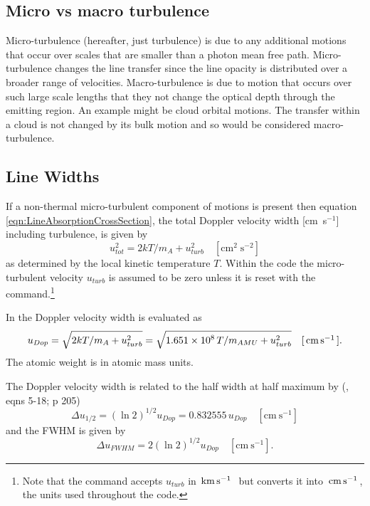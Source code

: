 \subsection{Micro vs macro turbulence}

Micro-turbulence (hereafter, just turbulence) is due to any additional
motions that occur over scales that are smaller than a photon mean free
path.
Micro-turbulence changes the line transfer since the line opacity
is distributed over a broader range of velocities.
Macro-turbulence is
due to motion that occurs over such large scale lengths that they not change
the optical depth through the emitting region.
An example might be cloud
orbital motions.
The transfer within a cloud is not changed by its bulk
motion and so would be considered macro-turbulence.

\subsection{Line Widths}

If a non-thermal micro-turbulent component of motions is present then
equation \ref{eqn:LineAbsorptionCrossSection},
the total Doppler velocity width [cm~s$^{-1}$] including turbulence,
is given by
\begin{equation}
u_{tot}^2 = 2kT/{m_A} + u_{turb}^2
\quad[\mathrm{cm}^2 \; \mathrm{s}^{-2}]
\end{equation}
as determined by the local kinetic temperature $T$.
Within the code the
micro-turbulent velocity $u_{turb}$ is assumed to be zero
unless it is reset
with the  command.\footnote{Note that the
 command accepts $u_{turb}$ in $\mbox{${\rm\thinspace km}\mbox{${\rm\thinspace s}^{-1}\,$}\,$}$ but converts
it into $\mbox{${\rm\thinspace cm}{\rm\thinspace s}^{-1}\,$}$, the units used throughout the code.}

In  the Doppler velocity width is evaluated as
\begin{equation}
{u_{Dop}} = \sqrt {2kT/{m_A} + u_{turb}^2}  = \sqrt {1.651 \times
{{10}^8}\,T/{m_{AMU}} + u_{turb}^2}
\quad  [\mbox{${\rm\thinspace cm}{\rm\thinspace s}^{-1}\,$}].
\end{equation}
The atomic weight is in atomic mass units.

The Doppler velocity width is related to the half width at half maximum
by (\citealp{Novotny1973}, eqns 5-18; p 205)
\begin{equation}
\Delta {u_{1/2}} = {\left( {\ln 2} \right)^{1/2}}{u_{Dop}} =
0.832555\,{u_{Dop}}
\quad  [\mathrm{cm~s}^{-1}]
\end{equation}
and the FWHM is given by
\begin{equation}
\Delta {u_{FWHM}} = 2{\left( {\ln 2} \right)^{1/2}}{u_{Dop}}
\quad [\mathrm{cm~s}^{-1}].
\end{equation}

